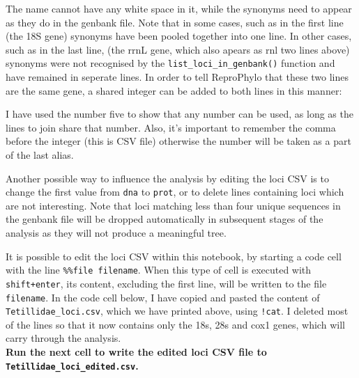 \documentclass[letterpaper,10pt,english]{/usr/share/sphinx/texinputs/sphinxhowto}
\begin{document}
The name cannot have any white space in it, while the synonyms need to
appear as they do in the genbank file. Note that in some cases, such as
in the first line (the 18S gene) synonyms have been pooled together into
one line. In other cases, such as in the last line, (the rrnL gene,
which also apears as rnl two lines above) synonyms were not recognised
by the \texttt{list\_loci\_in\_genbank()} function and have remained in
seperate lines. In order to tell ReproPhylo that these two lines are the
same gene, a shared integer can be added to both lines in this manner:

I have used the number five to show that any number can be used, as long
as the lines to join share that number. Also, it's important to remember
the comma before the integer (this is CSV file) otherwise the number
will be taken as a part of the last alias.

Another possible way to influence the analysis by editing the loci CSV
is to change the first value from \texttt{dna} to \texttt{prot}, or to
delete lines containing loci which are not interesting. Note that loci
matching less than four unique sequences in the genbank file will be
dropped automatically in subsequent stages of the analysis as they will
not produce a meaningful tree.

It is possible to edit the loci CSV within this notebook, by starting a
code cell with the line \texttt{\%\%file filename}. When this type of
cell is executed with \texttt{shift+enter}, its content, excluding the
first line, will be written to the file \texttt{filename}. In the code
cell below, I have copied and pasted the content of
\texttt{Tetillidae\_loci.csv}, which we have printed above, using
\texttt{!cat}. I deleted most of the lines so that it now contains only
the 18s, 28s and cox1 genes, which will carry through the
analysis.\\\textbf{Run the next cell to write the edited loci CSV file
to \texttt{Tetillidae\_loci\_edited.csv}.}

\end{document}
